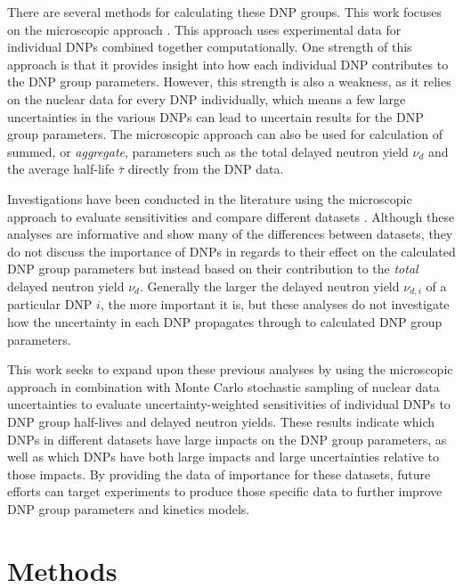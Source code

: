 \documentclass[hidelinks]{style/nseJournal}
\begin{document}
There are several methods for calculating these \gls{DNP} groups.
This work focuses on the microscopic approach \cite{d2002review, rudstam2002delayed, wilson2002delayed, brady1989delayed, mills2014calculation, huynh2014calculation, foligno_new_2019, piksaikin_new_2019, seifert2025delayed}.
This approach uses experimental data for individual \glspl{DNP} combined together computationally.
One strength of this approach is that it provides insight into how each individual \gls{DNP} contributes to the \gls{DNP} group parameters.
However, this strength is also a weakness, as it relies on the nuclear data for every \gls{DNP} individually, which means a few large uncertainties in the various \glspl{DNP} can lead to uncertain results for the \gls{DNP} group parameters.
The microscopic approach can also be used for calculation of summed, or \emph{aggregate}, parameters such as the total delayed neutron yield $\nu_d$ and the average half-life $\bar\tau$ directly from the \gls{DNP} data.

Investigations have been conducted in the literature using the microscopic approach to evaluate sensitivities and compare different datasets \cite{foligno_summation_2018, foligno_new_2019, mills2014calculation}.
Although these analyses are informative and show many of the differences between datasets, they do not discuss the importance of \glspl{DNP} in regards to their effect on the calculated \gls{DNP} group parameters but instead based on their contribution to the \emph{total} delayed neutron yield $\nu_d$.
Generally the larger the delayed neutron yield $\nu_{d,i}$ of a particular \gls{DNP} $i$, the more important it is, but these analyses do not investigate how the uncertainty in each \gls{DNP} propagates through to calculated \gls{DNP} group parameters.

This work seeks to expand upon these previous analyses by using the microscopic approach in combination with Monte Carlo stochastic sampling of nuclear data uncertainties to evaluate uncertainty-weighted sensitivities of individual \glspl{DNP} to \gls{DNP} group half-lives and delayed neutron yields.
These results indicate which \glspl{DNP} in different datasets have large impacts on the \gls{DNP} group parameters, as well as which \glspl{DNP} have both large impacts and large uncertainties relative to those impacts.
By providing the data of importance for these datasets, future efforts can target experiments to produce those specific data to further improve \gls{DNP} group parameters and kinetics models.


\section{Methods}
\end{document}
